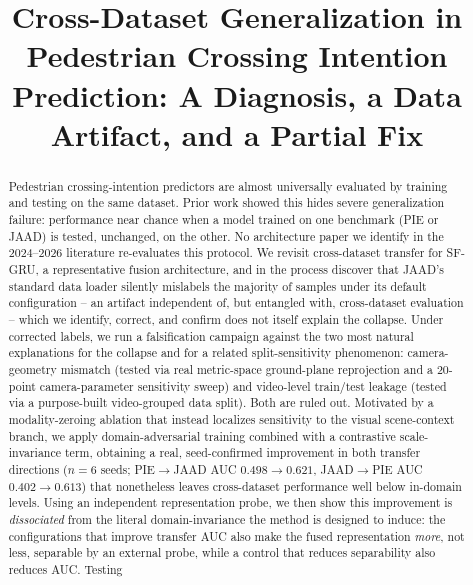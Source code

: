 \documentclass[conference]{IEEEtran}
\begin{document}
\title{Cross-Dataset Generalization in Pedestrian Crossing Intention\\
Prediction: A Diagnosis, a Data Artifact, and a Partial Fix}


\maketitle

\begin{abstract}
  Pedestrian crossing-intention predictors are almost universally
  evaluated by training and testing on the same dataset. Prior work
  showed this hides severe generalization failure: performance near
  chance when a model trained on one benchmark (PIE or JAAD) is tested,
  unchanged, on the other. No architecture paper we identify in the
  2024--2026 literature re-evaluates this protocol. We revisit
  cross-dataset transfer for SF-GRU, a representative fusion
  architecture, and in the process discover that JAAD's standard data
  loader silently mislabels the majority of samples under its default
  configuration -- an artifact independent of, but entangled with,
  cross-dataset evaluation -- which we identify, correct, and confirm
  does not itself explain the collapse. Under corrected labels, we run
  a falsification campaign against the two most natural explanations
  for the collapse and for a related split-sensitivity phenomenon:
  camera-geometry mismatch (tested via real metric-space ground-plane
  reprojection and a 20-point camera-parameter sensitivity sweep) and
  video-level train/test leakage (tested via a purpose-built
  video-grouped data split). Both are ruled out. Motivated by a
  modality-zeroing ablation that instead localizes sensitivity to the
  visual scene-context branch, we apply domain-adversarial training
  combined with a contrastive scale-invariance term, obtaining a real,
  seed-confirmed improvement in both transfer directions ($n=6$ seeds;
  PIE$\to$JAAD AUC $0.498\to0.621$, JAAD$\to$PIE AUC
  $0.402\to0.613$) that nonetheless leaves cross-dataset performance
  well below in-domain levels. Using an independent representation
  probe, we then show this improvement is \emph{dissociated} from the
  literal domain-invariance the method is designed to induce: the
  configurations that improve transfer AUC also make the fused
  representation \emph{more}, not less, separable by an external probe,
  while a control that reduces separability also reduces AUC. Testing

\end{abstract}
\end{document}
